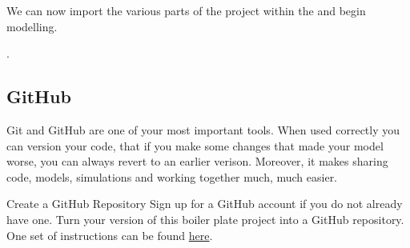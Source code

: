 \documentclass[../main]{subfiles}
\begin{document}
We can now import the various parts of the project
within the  and begin modelling.

.

\subsection{GitHub}
Git and GitHub are one of your most important tools. When used correctly you can version your code,
that if you make some changes that made your model worse, you can always revert to an
earlier verison. Moreover, it makes sharing code, models, simulations and working together much, much easier.

\begin{Task}{Create a GitHub Repository}
Sign up for a GitHub account if you do not already have one. Turn your version of this boiler plate
project into a GitHub repository. One set of instructions can be found
\href{https://help.github.com/en/github/getting-started-with-github/create-a-repo}{here}.
\end{Task}
\end{document}
